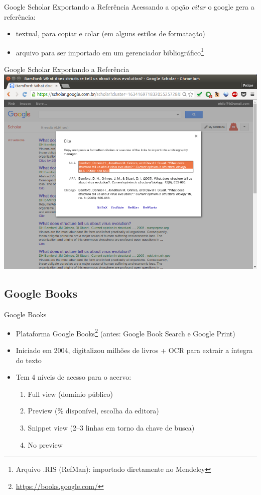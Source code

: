 \documentclass{beamer}
\begin{document}
\begin{frame}{Google Scholar Exportando a Referência}
  Acessando a opção {\em citar} o google gera a referência:
  \begin{itemize}
  \item textual, para copiar e colar (em alguns estilos de formatação)
  \item arquivo para ser importado em um gerenciador
    bibliográfico\footnote{Arquivo .RIS (RefMan): importado
      diretamente no Mendeley}
  \end{itemize}
\end{frame}

\begin{frame}{Google Scholar Exportando a Referência}
  \includegraphics[height=.85\textheight]{Busca/scholar-export}
\end{frame}

\subsection{Google Books}

\begin{frame}{Google Books}
  \begin{itemize}
  \item Plataforma \alert{Google
      Books}\footnote{\url{https://books.google.com/}} (antes: Google
    Book Search e Google Print)
  \item Iniciado em 2004, digitalizou milhões de livros + OCR para
    extrair a íntegra do texto
  \item Tem 4 níveis de acesso para o acervo:
    \begin{enumerate}
    \item Full view (domínio público)
    \item Preview (\% disponível, escolha da editora)
    \item Snippet view (2--3 linhas em torno da chave de busca)
    \item No preview
    \end{enumerate}
  \end{itemize}
\end{frame}
\end{document}
